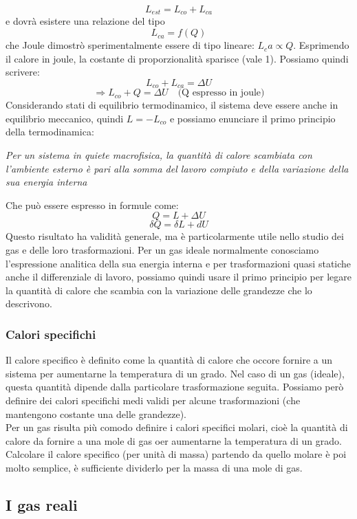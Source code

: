 \documentclass{article}
\begin{document}
$$ L_{est} = L_{co}+L_{ca} $$
e dovrà esistere una relazione del tipo
$$ L_{ca} = f(Q) $$
che Joule dimostrò sperimentalmente essere di tipo lineare: $L_ca\propto Q$. Esprimendo il calore in joule, la costante di proporzionalità sparisce (vale 1). Possiamo quindi scrivere:
$$ L_{co}+L_{ca}=\Delta U $$
$$\Rightarrow L_{co}+Q=\Delta U \quad\text{(Q espresso in joule)} $$
Considerando stati di equilibrio termodinamico, il sistema deve essere anche in equilibrio meccanico, quindi $L=-L_{co}$ e possiamo enunciare il primo principio della termodinamica:
\begin{center}
    \textit{Per un sistema in quiete macrofisica, la quantità di calore scambiata con l'ambiente esterno è pari alla somma del lavoro compiuto e della variazione della sua energia interna}
\end{center}
Che può essere espresso in formule come:
$$ Q=L+\Delta U $$
$$ \delta Q=\delta L + dU $$
Questo risultato ha validità generale, ma è particolarmente utile nello studio dei gas e delle loro trasformazioni. Per un gas ideale normalmente conosciamo l'espressione analitica della sua energia interna e per trasformazioni quasi statiche anche il differenziale di lavoro, possiamo quindi usare il primo principio per legare la quantità di calore che scambia con la variazione delle grandezze che lo descrivono.


\subsubsection{Calori specifichi}
Il calore specifico è definito come la quantità di calore che occore fornire a un sistema per aumentarne la temperatura di un grado. Nel caso di un gas (ideale), questa quantità dipende dalla particolare trasformazione seguita. Possiamo però definire dei calori specifichi medi validi per alcune trasformazioni (che mantengono costante una delle grandezze).\\
Per un gas risulta più comodo definire i calori specifici molari, cioè la quantità di calore da fornire a una mole di gas oer aumentarne la temperatura di un grado. Calcolare il calore specifico (per unità di massa) partendo da quello molare è poi molto semplice, è sufficiente dividerlo per la massa di una mole di gas.


\subsection{I gas reali}
\end{document}
